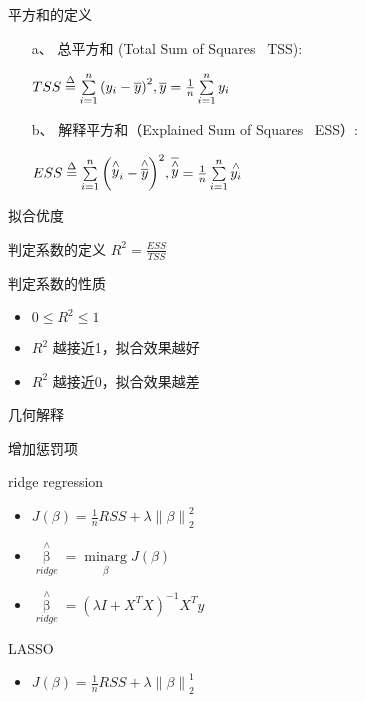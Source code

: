 \documentclass[xetex,mathserif,serif]{beamer}
\begin{document}
\begin{frame}{平方和的定义}
\begin{itemize}
  \item[a、]总平方和 (Total Sum of Squares \ TSS):
  \begin{center}
    $TSS \buildrel \Delta \over = {\sum\limits_{i = 1}^n {\left( {{y_i} - \overline y } \right)} ^2},\overline y  = \frac{1}{n}\sum\limits_{i = 1}^n {{y_i}} $
  \end{center}
  \item[b、]解释平方和（Explained Sum of Squares \ ESS）:
  \begin{center}
    $ESS \buildrel \Delta \over = {\sum\limits_{i = 1}^n {\left( {{{\mathop y\limits^ \wedge  }_i} - \mathop {\overline y }\limits^ \wedge  } \right)} ^2},\overline {\mathop y\limits^ \wedge  }  = \frac{1}{n}\sum\limits_{i = 1}^n {\mathop {{y_i}}\limits^ \wedge  } $
  \end{center}
\end{itemize}
\end{frame}

\begin{frame}{拟合优度}
\begin{block}{判定系数的定义}
${R^2} = \frac{{ESS}}{{TSS}}$
\end{block}

\begin{block}{判定系数的性质}
\begin{itemize}
  \item $0 \leq R^2 \leq 1$
  \item $R^2$ 越接近1，拟合效果越好
  \item $R^2$ 越接近0，拟合效果越差
\end{itemize}
\end{block}
\end{frame}

\begin{frame}{几何解释}

\end{frame}

\begin{frame}{增加惩罚项}
\begin{block}{ridge regression}
\begin{itemize}
  \item $J\left( \beta  \right) = \frac{1}{n}RSS + \lambda \left\| \beta  \right\|_2^2$
  \item ${\mathop \beta \limits^ \wedge  _{ridge}} = \mathop {\min \arg }\limits_\beta  J\left( \beta  \right)$
  \item ${\mathop \beta \limits^ \wedge  _{ridge}} = {\left( {\lambda I + {X^T}X} \right)^{ - 1}}{X^T}y$
\end{itemize}
\end{block}

\begin{block}{LASSO}
\begin{itemize}
  \item $J\left( \beta  \right) = \frac{1}{n}RSS + \lambda \left\| \beta  \right\|_2^1$
\end{itemize}
\end{block}
\end{frame}
\end{document}
